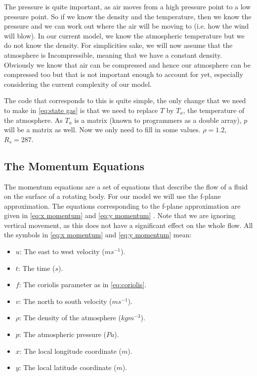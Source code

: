 The pressure is quite important, as air moves from a high pressure point to a low pressure point. So if we know the density and the temperature, then we know the pressure and we can work out 
where the air will be moving to (i.e. how the wind will blow). In our current model, we know the atmospheric temperature but we do not know the density. For simplicities sake, we will now assume
that the atmosphere is Incompressible, meaning that we have a constant density. Obviously we know that air can be compressed and hence our atmosphere can be compressed too but that is not 
important enough to account for yet, especially considering the current complexity of our model.

The code that corresponds to this is quite simple, the only change that we need to make in \autoref{eq:state gas} is that we need to replace $T$ by $T_a$, the temperature of the atmosphere. As
$T_a$ is a matrix (known to programmers as a double array), $p$ will be a matrix as well. Now we only need to fill in some values. $\rho = 1.2$\cite{densityAir}, $R_s = 287$\cite{specificGasConstantAir}.

\subsection{The Momentum Equations} \label{sec:momentum}
The momentum equations are a set of equations that describe the flow of a fluid on the surface of a rotating body. For our model we will use the f-plane approximation. The equations corresponding
to the f-plane approximation are given in \autoref{eq:x momentum} and \autoref{eq:y momentum} \cite{momentumeqs}. Note that we are ignoring vertical movement, as this does not have a significant
effect on the whole flow. All the symbols in \autoref{eq:x momentum} and \autoref{eq:y momentum} mean:

\begin{itemize}
    \item $u$: The east to west velocity ($ms^{-1}$).
    \item $t$: The time ($s$).
    \item $f$: The coriolis parameter as in \autoref{eq:coriolis}.
    \item $v$: The north to south velocity ($ms^{-1}$).
    \item $\rho$: The density of the atmosphere ($kgm^{-3}$).
    \item $p$: The atmospheric pressure ($Pa$).
    \item $x$: The local longitude coordinate ($m$).
    \item $y$: The local latitude coordinate ($m$).
\end{itemize}

